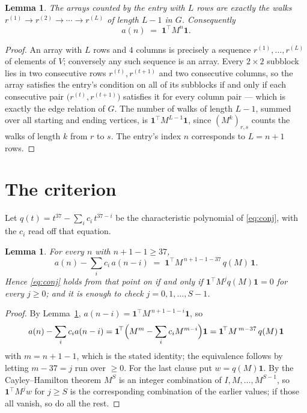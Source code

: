 \documentclass[11pt,a4paper]{article}
\theoremstyle{plain}
\newtheorem{lemma}[theorem]{Lemma}
\theoremstyle{definition}
\begin{document}
\begin{lemma}\label{lem:walk}
The arrays counted by the entry with $L$ rows are exactly the walks
$r^{(1)}\to r^{(2)}\to\cdots\to r^{(L)}$ of length $L-1$ in $G$. Consequently
\[
a(n)\;=\;\mathbf{1}^{\!\top}M^{n}\mathbf{1} .
\]
\end{lemma}

\begin{proof}
An array with $L$ rows and $4$ columns is precisely a sequence
$r^{(1)},\dots,r^{(L)}$ of elements of $V$; conversely any such sequence is an array.
Every $2\times2$ subblock lies in two consecutive rows $r^{(t)},r^{(t+1)}$ and two
consecutive columns, so the array satisfies the entry's condition on all of its subblocks
if and only if each consecutive pair $\bigl(r^{(t)},r^{(t+1)}\bigr)$ satisfies it for
every column pair --- which is exactly the edge relation of $G$. The number of walks of
length $L-1$, summed over all starting and ending vertices, is
$\mathbf{1}^{\!\top}M^{L-1}\mathbf{1}$, since $(M^{k})_{r,s}$ counts the walks of
length $k$ from $r$ to $s$. The entry's index $n$ corresponds to $L=n+1$ rows.
\end{proof}

\section{The criterion}

Let $q(t)=t^{37}-\sum_i c_i\,t^{37-i}$ be the characteristic polynomial of
\eqref{eq:conj}, with the $c_i$ read off that equation.

\begin{lemma}\label{lem:crit}
For every $n$ with $n+1-1\ge37$,
\[
a(n)-\sum_i c_i\,a(n-i)\;=\;\mathbf{1}^{\!\top}M^{\,n+1-1-37}\,q(M)\,\mathbf{1} .
\]
Hence \eqref{eq:conj} holds from that point on if and only if
$\mathbf{1}^{\!\top}M^{j}q(M)\mathbf{1}=0$ for every $j\ge0$; and it is enough to check
$j=0,1,\dots,S-1$.
\end{lemma}

\begin{proof}
By Lemma~\ref{lem:walk}, $a(n-i)=\mathbf{1}^{\!\top}M^{\,n+1-1-i}\mathbf{1}$, so
\[
a(n)-\sum_i c_i a(n-i)
=\mathbf{1}^{\!\top}\Bigl(M^{m}-\sum_i c_i M^{m-i}\Bigr)\mathbf{1}
=\mathbf{1}^{\!\top}M^{\,m-37}\,q(M)\,\mathbf{1}
\]
with $m=n+1-1$, which is the stated identity; the equivalence follows by letting
$m-37=j$ run over $\ge0$. For the last clause put $w=q(M)\mathbf{1}$. By the
Cayley--Hamilton theorem $M^{S}$ is an integer combination of $I,M,\dots,M^{S-1}$, so
$\mathbf{1}^{\!\top}M^{j}w$ for $j\ge S$ is the corresponding combination of the earlier
values; if those all vanish, so do all the rest.
\end{proof}
\end{document}
